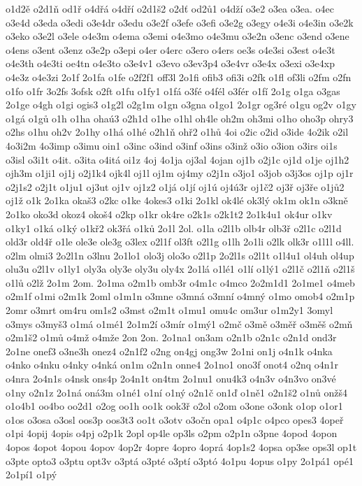 {o1d2ě
o2d1ň
od1ř
o4dřá
o4dří
o2d1š2
o2dť
od2ů1
o4dží
o3e2
o3ea
o3ea.
o4ec
o3e4d
o3eda
o3edi
o3e4dr
o3edu
o3e2f
o3efe
o3efi
o3e2g
o3egy
o4e3i
o4e3in
o3e2k
o3eko
o3e2l
o3ele
o4e3m
o4ema
o3emi
o4e3mo
o4e3mu
o3e2n
o3enc
o3end
o3ene
o4ens
o3ent
o3enz
o3e2p
o3epi
o4er
o4erc
o3ero
o4ers
oe3s
o4e3si
o3est
o4e3t
o4e3th
o4e3ti
oe4tn
o4e3to
o3e4v1
o3evo
o3ev3p4
o3e4vr
o3e4x
o3exi
o3e4xp
o4e3z
o4e3zi
2o1f
2o1fa
o1fe
o2f2f1
off3l
2o1fi
ofib3
ofi3i
o2fk
o1fl
of3li
o2fm
o2fn
o1fo
o1fr
3o2fs
3ofsk
o2ft
o1fu
o1fy1
o1fá
o3fé
o4fél
o3fér
o1fí
2o1g
o1ga
o3gas
2o1ge
o4gh
o1gi
ogis3
o1g2l
o2g1m
o1gn
o3gna
o1go1
2o1gr
og3ré
o1gu
og2v
o1gy
o1gá
o1gů
o1h
o1ha
ohaú3
o2h1d
o1he
o1hl
oh4le
oh2m
oh3mi
o1ho
oho3p
ohry3
o2hs
o1hu
oh2v
2o1hy
o1há
o1hé
o2h1ň
ohř2
o1hů
4oi
o2ic
o2id
o3ide
4o2ik
o2il
4o3i2m
4o3imp
o3imu
oin1
o3inc
o3ind
o3inf
o3ins
o3inž
o3io
o3ion
o3irs
oi1s
o3isl
o3i1t
o4it.
o3ita
o4itá
oi1z
4oj
4o1ja
oj3al
4ojan
oj1b
o2j1c
oj1d
o1je
oj1h2
ojh3m
o1ji1
oj1j
o2j1k4
ojk4l
oj1l
oj1m
oj4my
o2j1n
o3jo1
o3job
o3j3os
oj1p
oj1r
o2j1s2
o2j1t
o1ju1
oj3ut
oj1v
oj1z2
o1já
o1jí
oj1ú
oj4ú3r
oj1č2
oj3ř
oj3ře
o1jů2
oj1ž
o1k
2o1ka
okaš3
o2kc
o1ke
4okes3
o1ki
2o1kl
ok4lé
ok3lý
ok1m
ok1n
o3kně
2o1ko
oko3d
okoz4
okoš4
o2kp
o1kr
ok4re
o2k1s
o2k1t2
2o1k4u1
ok4ur
o1kv
o1ky1
o1ká
o1ký
o1kř2
ok3řá
o1ků
2o1l
2ol.
o1la
o2l1b
olb4r
olb3ř
o2l1c
o2l1d
old3r
old4ř
o1le
ole3e
ole3g
o3lex
o2l1f
ol3ft
o2l1g
o1lh
2o1li
o2lk
olk3r
o1l1l
o4ll.
o2lm
olmi3
2o2l1n
o3lnu
2o1lo1
olo3j
olo3o
o2l1p
2o2l1s
o2l1t
o1l4u1
ol4uh
ol4up
olu3u
o2l1v
o1ly1
oly3a
oly3e
oly3u
oly4x
2o1lá
o1lé1
o1lí
o1lý1
o2l1č
o2l1ň
o2l1š
o1lů
o2lž
2o1m
2om.
2o1ma
o2m1b
omb3r
o4m1c
o4mco
2o2m1d1
2o1me1
o4meb
o2m1f
o1mi
o2m1k
2oml
o1m1n
o3mne
o3mná
o3mní
o4mný
o1mo
omob4
o2m1p
2omr
o3mrt
om4ru
om1s2
o3mst
o2m1t
o1mu1
omu4c
om3ur
o1m2y1
3omyl
o3mys
o3myš3
o1má
o1mé1
2o1m2í
o3mír
o1mý1
o2mč
o3mě
o3měř
o3měš
o2mň
o2m1š2
o1mů
o4mž
o4mže
2on
2on.
2o1na1
on3am
o2n1b
o2n1c
o2n1d
ond3r
2o1ne
onef3
o3ne3h
onez4
o2n1f2
o2ng
on4gj
ong3w
2o1ni
on1j
o4n1k
o4nka
o4nko
o4nku
o4nky
o4nká
on1m
o2n1n
onne4
2o1no1
ono3f
onot4
o2nq
o4n1r
o4nra
2o4n1s
o4nsk
ons4p
2o4n1t
on4tm
2o1nu1
onu4k3
o4n3v
o4n3vo
on3vé
o1ny
o2n1z
2o1ná
oná3m
o1né1
o1ní
o1ný
o2n1č
on1ď
o1ně1
o2n1š2
o1nů
onžš4
o1o4b1
oo4bo
oo2d1
o2og
oo1h
oo1k
ook3ř
o2ol
o2om
o3one
o3onk
o1op
o1or1
o1os
o3osa
o3osl
oos3p
oos3t3
oo1t
o3otv
o3očn
opa1
o4p1c
o4pco
opes3
4opeř
o1pi
4opij
4opis
o4pj
o2p1k
2opl
op4le
op3ls
o2pm
o2p1n
o3pne
4opod
4opon
4opos
4opot
4opou
4opov
4op2r
4opre
4opro
4oprá
4op1s2
4opsa
op3se
ops3l
op1t
o3pte
opto3
o3ptu
opt3v
o3ptá
o3pté
o3ptí
o3ptó
4o1pu
4opus
o1py
2o1pá1
opé1
2o1pí1
o1pý
}
